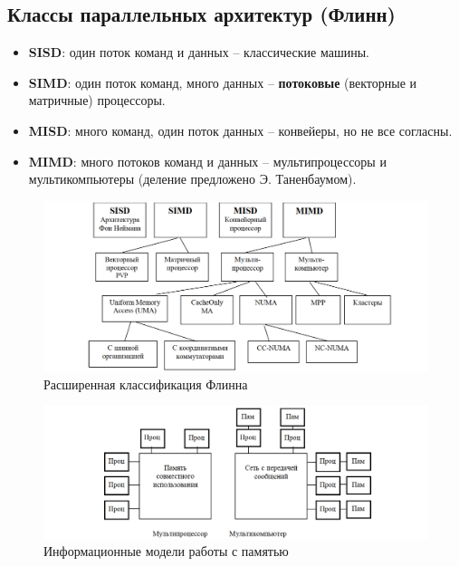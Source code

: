 	\subsection{Классы параллельных архитектур (Флинн)}
	\begin{itemize}
		\item \textbf{SISD}: один поток команд и данных -- классические машины.
		\item \textbf{SIMD}: один поток команд, много данных -- \textbf{потоковые} (векторные и матричные) процессоры.
		\item \textbf{MISD}: много команд, один поток данных -- конвейеры, но не все согласны.
		\item \textbf{MIMD}: много потоков команд и данных -- мультипроцессоры и мультикомпьютеры 
		\newline
		(деление предложено Э. Таненбаумом).
	\end{itemize}
	\vspace{-1.5em}
	\begin{figure}[H]
		\centering
		\includegraphics[width=1\linewidth, height=0.3\textheight]{img/02_03}
		{\small Расширенная классификация Флинна}
		\label{fig:02_03}
	\end{figure}
	\vspace{-2em}
	\begin{figure}[H]
		\centering
		\includegraphics[width=1\linewidth, height=0.2\textheight]{img/02_04}
		{\small Информационные модели работы с памятью}
		\label{fig:02_04}
	\end{figure}
	
